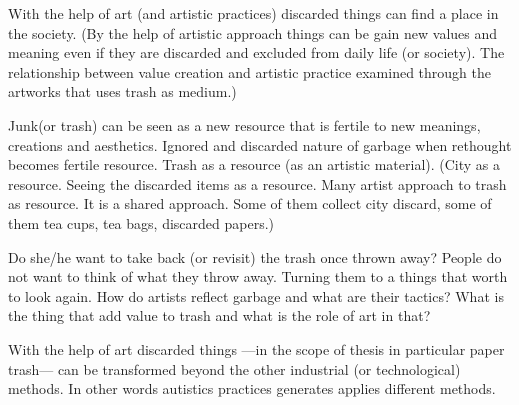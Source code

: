 

With the help of art (and artistic practices) discarded things can find a place in the society. (By the help of artistic approach things can be gain new values and meaning even if they are discarded and excluded from daily life (or society). The relationship between value creation and artistic practice examined through the artworks that uses trash as medium.)


Junk(or trash) can be seen as a new resource that is fertile to new meanings, creations and aesthetics. Ignored and discarded nature of garbage when rethought becomes fertile resource. Trash as a resource (as an artistic material). (City as a resource. Seeing the discarded items as a resource. Many artist approach to trash as resource. It is a shared approach. Some of them collect city discard, some of them tea cups, tea bags, discarded papers.)


Do she/he want to take back (or revisit) the trash once thrown away? People do not want to think of what they throw away. Turning them to a things that worth to look again. How do artists reflect garbage and what are their tactics? What is the thing that add value to trash and what is the role of art in that?

With the help of art discarded things ---in the scope of thesis in particular paper trash--- can be transformed beyond the other industrial (or technological) methods. In other words autistics practices generates applies different methods.


